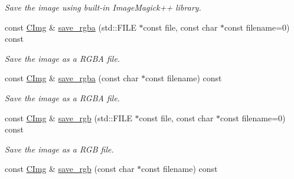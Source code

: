\begin{DoxyCompactItemize}
\begin{DoxyCompactList}\small\item\em Save the image using built-\/in Image\-Magick++ library. \end{DoxyCompactList}\item 
\hypertarget{structcimg__library_1_1_c_img_a133af6a59ecc79219f1b2f68bee475bb}{const \hyperlink{structcimg__library_1_1_c_img}{C\-Img} \& \hyperlink{structcimg__library_1_1_c_img_a133af6a59ecc79219f1b2f68bee475bb}{save\-\_\-rgba} (std\-::\-F\-I\-L\-E $\ast$const file, const char $\ast$const filename=0) const }\label{structcimg__library_1_1_c_img_a133af6a59ecc79219f1b2f68bee475bb}

\begin{DoxyCompactList}\small\item\em Save the image as a R\-G\-B\-A file. \end{DoxyCompactList}\item 
\hypertarget{structcimg__library_1_1_c_img_a2d8147748e3dab5dcd010fb2bf46d7ec}{const \hyperlink{structcimg__library_1_1_c_img}{C\-Img} \& \hyperlink{structcimg__library_1_1_c_img_a2d8147748e3dab5dcd010fb2bf46d7ec}{save\-\_\-rgba} (const char $\ast$const filename) const }\label{structcimg__library_1_1_c_img_a2d8147748e3dab5dcd010fb2bf46d7ec}

\begin{DoxyCompactList}\small\item\em Save the image as a R\-G\-B\-A file. \end{DoxyCompactList}\item 
\hypertarget{structcimg__library_1_1_c_img_a05f2988b7be539403f308b06389f2767}{const \hyperlink{structcimg__library_1_1_c_img}{C\-Img} \& \hyperlink{structcimg__library_1_1_c_img_a05f2988b7be539403f308b06389f2767}{save\-\_\-rgb} (std\-::\-F\-I\-L\-E $\ast$const file, const char $\ast$const filename=0) const }\label{structcimg__library_1_1_c_img_a05f2988b7be539403f308b06389f2767}

\begin{DoxyCompactList}\small\item\em Save the image as a R\-G\-B file. \end{DoxyCompactList}\item 
\hypertarget{structcimg__library_1_1_c_img_a871402e0f41b33b8e560354d858f03bd}{const \hyperlink{structcimg__library_1_1_c_img}{C\-Img} \& \hyperlink{structcimg__library_1_1_c_img_a871402e0f41b33b8e560354d858f03bd}{save\-\_\-rgb} (const char $\ast$const filename) const }\label{structcimg__library_1_1_c_img_a871402e0f41b33b8e560354d858f03bd}


\end{DoxyCompactItemize}
